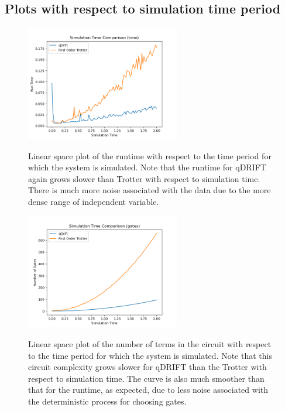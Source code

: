 \documentclass[letterpaper, 11pt]{article}
\begin{document}
\subsection*{Plots with respect to simulation time period}
\begin{figure}[H]
\centering
\includegraphics[width = 0.6\textwidth]{plots/sim_time_time_comp.png}
\label{html}
\caption{Linear space plot of the runtime with respect to the time period for which the system is simulated. Note that the runtime for qDRIFT again grows slower than Trotter with respect to simulation time. There is much more noise associated with the data due to the more dense range of independent variable.}
\end{figure}
\begin{figure}[H]
\centering
\includegraphics[width = 0.6\textwidth]{plots/sim_time_gates_comp.png}
\label{html}
\caption{Linear space plot of the number of terms in the circuit with respect to the time period for which the system is simulated. Note that this circuit complexity grows slower for qDRIFT than the Trotter with respect to simulation time. The curve is also much smoother than that for the runtime, as expected, due to less noise associated with the deterministic process for choosing gates.}
\end{figure}


\end{document}

